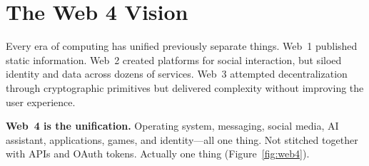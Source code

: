 \documentclass[11pt,a4paper]{article}
\begin{document}
\section{The Web 4 Vision}

Every era of computing has unified previously separate things. Web~1 published static information. Web~2 created platforms for social interaction, but siloed identity and data across dozens of services. Web~3 attempted decentralization through cryptographic primitives but delivered complexity without improving the user experience.

\textbf{Web~4 is the unification.} Operating system, messaging, social media, AI assistant, applications, games, and identity---all one thing. Not stitched together with APIs and OAuth tokens. Actually one thing (Figure~\ref{fig:web4}).
\end{document}
